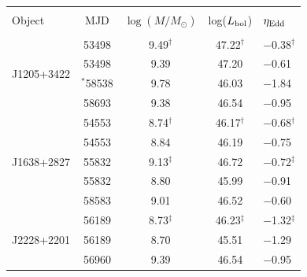 \documentclass[fleqn,usenatbib]{mnras}
\begin{document}
\begin{table}
  \centering
  \begin{tabular}{l c cc l}
    \hline
    \hline
                      &                 &                                     &                               & \\
Object            & MJD          &  $\log (M/M_{\odot})$  & log($L_{\rm bol}$)    &  $\eta_{\rm Edd}$  \\
                      &                 &                                     &                               & \\
    \hline
\multirow{4}{*}{J1205+3422} & 53498          &   9.49$^{\dagger }$   &   47.22$^{\dagger }$  & $-$0.38$^{\dagger }$   \\
                                             &  53498        &   9.39                       &   47.20                      & $-$0.61   \\
                                             & $^{*}$58538  &   9.78                       &  46.03                      & $-$1.84 \\  
                                             & 58693            &  9.38                       &  46.54                      &  $-$0.95  \\                    
    \hline
\multirow{5}{*}{J1638+2827} & 54553            & 8.74$^{\dagger }$     &  46.17$^{\dagger }$   & $-$0.68$^{\dagger }$  \\
                                              & 54553            & 8.84                        &   46.19    & $-$0.75  \\
                                             & 55832           & 9.13$^{\ddagger }$  &    46.72    & $-$0.72$^{\ddagger }$  \\      
                                             & 55832          & 8.80                         &   45.99    & $-$0.91 \\     
                                             & 58583           & 9.01                        &    46.52    & $-$0.60   \\
    \hline
\multirow{4}{*}{ J2228+2201} & 56189         & 8.73$^{\ddagger }$ & 46.23$^{\ddagger }$  &  $-$1.32$^{\ddagger }$ \\
                                              &  56189      & 8.70                       & 45.51                        &  $-$1.29 \\
                                              & 56960         &  9.39                      &  46.54                        & $-$0.95  \\      

\end{tabular}
\end{table}
\end{document}
